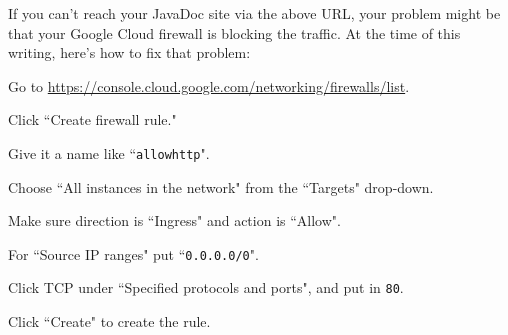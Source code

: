 If you can't reach your JavaDoc site via the above URL, your problem might be
that your Google Cloud firewall is blocking the traffic. At the time of this
writing, here's how to fix that problem:

\begin{compactenum}

\item Go to \url{https://console.cloud.google.com/networking/firewalls/list}.
\item Click ``Create firewall rule."
\item Give it a name like ``\texttt{allowhttp}".
\item Choose ``All instances in the network" from the ``Targets" drop-down.
\item Make sure direction is ``Ingress" and action is ``Allow".
\item For ``Source IP ranges" put ``\texttt{0.0.0.0/0}".
\item Click TCP under ``Specified protocols and ports", and put in \texttt{80}.
\item Click ``Create" to create the rule.
\end{compactenum}



